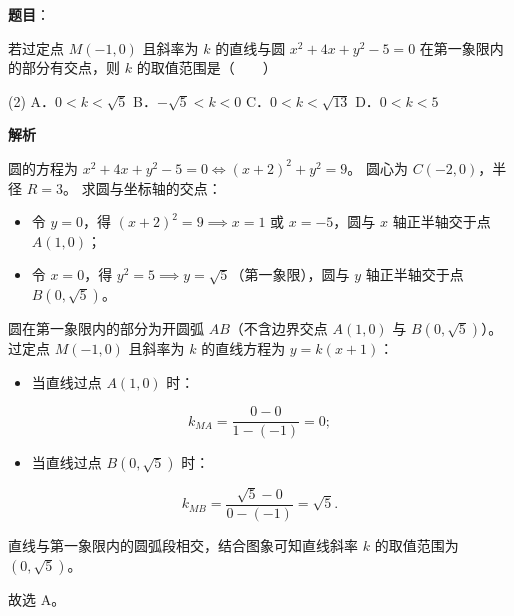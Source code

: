 \begin{answer}

\textbf{题目}：

若过定点 $M(-1, 0)$ 且斜率为 $k$ 的直线与圆 $x^2 + 4x + y^2 - 5 = 0$ 在第一象限内的部分有交点，则 $k$ 的取值范围是\mbox{（　　）}

\begin{gkopts}(2)
\task A．$0 < k < \sqrt{5}$
\task B．$-\sqrt{5} < k < 0$
\task C．$0 < k < \sqrt{13}$
\task D．$0 < k < 5$
\end{gkopts}

\textbf{解析}

圆的方程为 $x^2 + 4x + y^2 - 5 = 0 \iff (x+2)^2 + y^2 = 9$。
圆心为 $C(-2, 0)$，半径 $R = 3$。
求圆与坐标轴的交点：
\begin{itemize}
\item 令 $y = 0$，得 $(x+2)^2 = 9 \implies x = 1$ 或 $x = -5$，圆与 $x$ 轴正半轴交于点 $A(1, 0)$；
\item 令 $x = 0$，得 $y^2 = 5 \implies y = \sqrt{5}$（第一象限），圆与 $y$ 轴正半轴交于点 $B(0, \sqrt{5})$。
\end{itemize}

圆在第一象限内的部分为开圆弧 $AB$（不含边界交点 $A(1, 0)$ 与 $B(0, \sqrt{5})$）。
过定点 $M(-1, 0)$ 且斜率为 $k$ 的直线方程为 $y = k(x+1)$：
\begin{itemize}
\item 当直线过点 $A(1, 0)$ 时：
\end{itemize}
\nopagebreak[4]
\[
k_{MA} = \dfrac{0 - 0}{1 - (-1)} = 0;
\]
\begin{itemize}
\item 当直线过点 $B(0, \sqrt{5})$ 时：
\end{itemize}
\nopagebreak[4]
\[
k_{MB} = \dfrac{\sqrt{5} - 0}{0 - (-1)} = \sqrt{5}.
\]

直线与第一象限内的圆弧段相交，结合图象可知直线斜率 $k$ 的取值范围为 $(0, \sqrt{5})$。

故选 A。


\end{answer}
